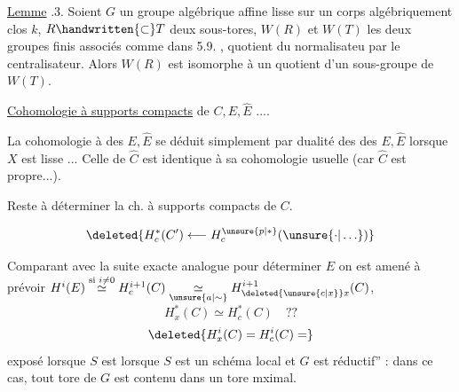 \uline{Lemme} .3. Soient $G$ un groupe algébrique affine lisse sur un corps algébriquement clos $k$, $R\handwritten{\subset}T$ deux sous-tores, $W(R)$ et $W(T)$ les deux groupes finis associés comme dans  5.9. , quotient du normalisateu par le centralisateur. Alors $W(R)$ est isomorphe à un quotient d'un sous-groupe de $W(T)$.

\uline{Cohomologie à supports compacts}  de $C,E,\widehat E$ ....

La cohomologie à  des $E,\widehat E$ se déduit simplement par dualité des   des $E,\widehat E$ lorsque $X$ est lisse ... Celle de $\widehat C$ est identique à sa cohomologie usuelle (car $\widehat C$ est propre...).

Reste à déterminer la ch. à supports compacts de $C$.

\[
\deleted{H_c^*(C')\longleftarrow H_c^{\unsure{p|*}}(\unsure{\cdot|\ldots})}
\]


Comparant avec la suite exacte analogue pour déterminer  $E$  on est amené à prévoir $H^i(E)\overset{\text{si }i\ne0}{\simeq}H_c^{i+1}(C)\mathrel{\underset{\unsure{a|\sim}}{\simeq}}H_{\deleted{\unsure{c|x}}x}^{i+1}(C)$,  
\[
\boxed{H_x^*(C)\simeq H_c^*(C)\quad ??}
\]
\[
\deleted{H_x^i(C)=H_c^i(C)=}
\]
exposé     lorsque $S$ est  \handwritten{,}     lorsque $S$ est un schéma local et $G$ est \handwritten{\textquotedblleft}réductif'' : dans ce cas, tout tore de $G$ est contenu dans un tore mximal.

